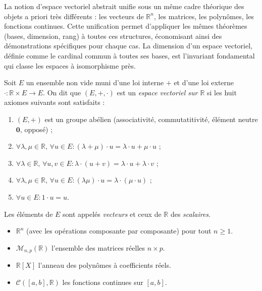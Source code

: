 \documentclass[11pt,a4paper,twoside]{book}
\newcommand{\R}{\mathbb{R}}
\begin{document}
La notion d'espace vectoriel abstrait unifie sous un même cadre théorique des objets a priori très différents : les vecteurs de $\mathbb{R}^n$, les matrices, les polynômes, les fonctions continues. Cette unification permet d'appliquer les mêmes théorèmes (bases, dimension, rang) à toutes ces structures, économisant ainsi des démonstrations spécifiques pour chaque cas. La dimension d'un espace vectoriel, définie comme le cardinal commun à toutes ses bases, est l'invariant fondamental qui classe les espaces à isomorphisme près.

\begin{definitionbox}
Soit $E$ un ensemble non vide muni d'une loi interne \(+\) et d'une loi externe
\(\cdot : \R \times E \to E\). On dit que $(E,+,\cdot)$ est un \emph{espace vectoriel sur \(\R\)}
si les huit axiomes suivants sont satisfaits :
\begin{enumerate}[label=\alph*)]
  \item $(E,+)$ est un groupe abélien (associativité, commutatitivité, élément neutre $\mathbf{0}$, opposé) ;
  \item $\forall \lambda,\mu \in \R,\,\forall u \in E : (\lambda+\mu)\cdot u = \lambda \cdot u + \mu \cdot u$ ;
  \item $\forall \lambda \in \R,\,\forall u,v \in E : \lambda \cdot (u+v) = \lambda \cdot u + \lambda \cdot v$ ;
  \item $\forall \lambda,\mu \in \R,\,\forall u \in E : (\lambda\mu) \cdot u = \lambda \cdot (\mu \cdot u)$ ;
  \item $\forall u \in E : 1 \cdot u = u$.
\end{enumerate}
Les éléments de $E$ sont appelés \emph{vecteurs} et ceux de $\R$ des \emph{scalaires}.
\end{definitionbox}

\begin{exemplebox}
\begin{itemize}
  \item $\R^n$ (avec les opérations composante par composante) pour tout $n \geq 1$.
  \item $\mathcal{M}_{n,p}(\R)$ l'ensemble des matrices réelles $n \times p$.
  \item $\R[X]$ l'anneau des polynômes à coefficients réels.
  \item $\mathcal{C}([a,b],\R)$ les fonctions continues sur $[a,b]$.
\end{itemize}
\end{exemplebox}
\end{document}
